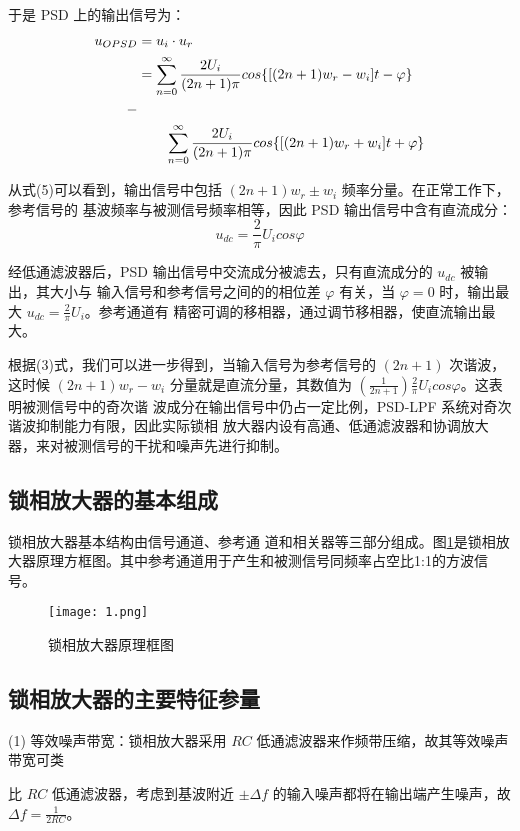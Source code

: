 \documentclass{whureport}
\begin{document}
\begin{multicols}{2}
于是 PSD 上的输出信号为：
\begin{align}
    u_{OPSD} &= u_i \cdot u_r \\
             &= \sum_{n=0}^{\infty} \frac{2 U_i}{(2n+1)\pi} cos\{[(2n + 1)w_r - w_i]t - \varphi \} \\- \notag \\
             & \qquad \sum_{n=0}^{\infty} \frac{2 U_i}{(2n+1)\pi} cos\{[(2n + 1)w_r + w_i]t + \varphi \}
\end{align}

从式(5)可以看到，输出信号中包括 $(2n + 1)w_r \pm w_i$ 频率分量。在正常工作下，参考信号的
基波频率与被测信号频率相等，因此 PSD 输出信号中含有直流成分\cite{Meade1983}：
\begin{equation}
    u_{dc} = \frac{2}{\pi} U_i cos\varphi
\end{equation}

经低通滤波器后，PSD 输出信号中交流成分被滤去，只有直流成分的 $u_{dc}$ 被输出，其大小与
输入信号和参考信号之间的的相位差 $\varphi$ 有关，当 $\varphi = 0$ 时，输出最大 $u_{dc} = \frac{2}{\pi} U_i$。参考通道有
精密可调的移相器，通过调节移相器，使直流输出最大。

根据(3)式，我们可以进一步得到，当输入信号为参考信号的 $(2n + 1)$ 次谐波，这时候
$(2n + 1)w_r - w_i$ 分量就是直流分量，其数值为 $(\frac{1}{2n+1}) \frac{2}{\pi} U_i cos\varphi$。这表明被测信号中的奇次谐
波成分在输出信号中仍占一定比例，PSD-LPF 系统对奇次谐波抑制能力有限，因此实际锁相
放大器内设有高通、低通滤波器和协调放大器，来对被测信号的干扰和噪声先进行抑制。
\subsection{锁相放大器的基本组成}
锁相放大器基本结构由信号通道、参考通 道和相关器等三部分组成。图\ref{LA}是锁相放大器原理方框图。其中参考通道用于产生和被测信号同频率占空比1:1的方波信号。
\begin{figure}[H]
	\centering
	\texttt{[image: 1.png]}
	\caption{锁相放大器原理框图}	
	\label{LA}
\end{figure}
\subsection{锁相放大器的主要特征参量}
(1) 等效噪声带宽：锁相放大器采用 $RC$ 低通滤波器来作频带压缩，故其等效噪声带宽可类

比 $RC$ 低通滤波器，考虑到基波附近 $\pm \Delta f$ 的输入噪声都将在输出端产生噪声，故$\Delta f = \frac{1}{2RC}$。


\end{multicols}
\end{document}
